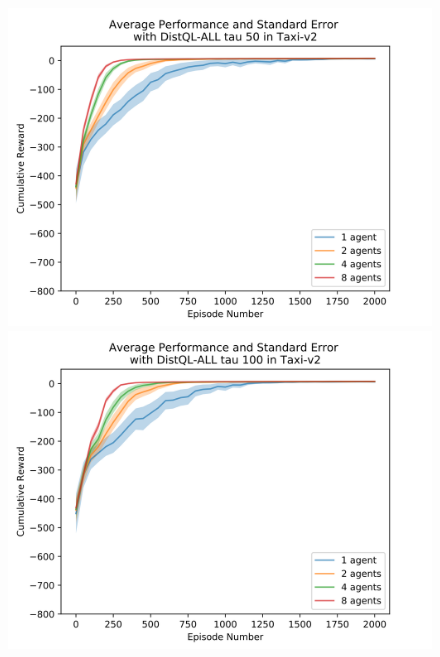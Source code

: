 \documentclass[jair,twoside,11pt,theapa]{article}
\begin{document}
\begin{figure}[h]
	\centering
	\begin{minipage}{.5\textwidth}
		\centering
		\includegraphics[width=1\linewidth]{resultImages/binned-Average-Performance-and-Standard-Error-with-DistQL-ALL-tau-50-in-Taxi-v2}
		\caption{}
		\label{fig:DistQL-ALL-tau-50-env-Taxi}
	\end{minipage}%
	\begin{minipage}{.5\textwidth}
		\centering
		\includegraphics[width=1\linewidth]{resultImages/binned-Average-Performance-and-Standard-Error-with-DistQL-ALL-tau-100-in-Taxi-v2}
		\caption{}
		\label{fig:DistQL-ALL-tau-100-env-Taxi}
	\end{minipage}
\end{figure}%
\end{document}
